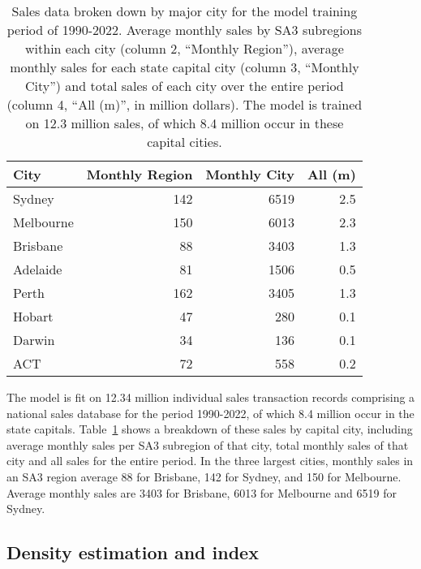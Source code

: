 \begin{table}[h!]
	\centering
	
\begin{tabular}{lrrr}
\toprule
     City &  Monthly Region &  Monthly City &  All (m) \\
\midrule
   Sydney &             142 &          6519 &      2.5 \\
Melbourne &             150 &          6013 &      2.3 \\
 Brisbane &              88 &          3403 &      1.3 \\
 Adelaide &              81 &          1506 &      0.5 \\
    Perth &             162 &          3405 &      1.3 \\
   Hobart &              47 &           280 &      0.1 \\
   Darwin &              34 &           136 &      0.1 \\
      ACT &              72 &           558 &      0.2 \\
\bottomrule
\end{tabular}


	\caption{Sales data broken down by major city for the model training period of 1990-2022. Average monthly sales by SA3 subregions within each city (column 2, ``Monthly Region''), average monthly sales for each state capital city (column 3, ``Monthly City'') and total sales of each city over the entire period (column 4, ``All (m)'', in million dollars). The model is trained on 12.3 million sales, of which 8.4 million occur in these capital cities.}
	\label{table:counts}
\end{table}

The model is fit on 12.34 million individual sales transaction records comprising a national sales database for the period 1990-2022, of which 8.4 million occur in the state capitals. Table~\ref{table:counts} shows a breakdown of these sales by capital city, including average monthly sales per SA3 subregion of that city, total monthly sales of that city and all sales for the entire period. In the three largest cities, monthly sales in an SA3 region average 88 for Brisbane, 142 for Sydney, and 150 for Melbourne. Average monthly sales are 3403 for Brisbane, 6013 for Melbourne and 6519 for Sydney.



\subsection{Density estimation and index}
\label{sec:dmodel}

